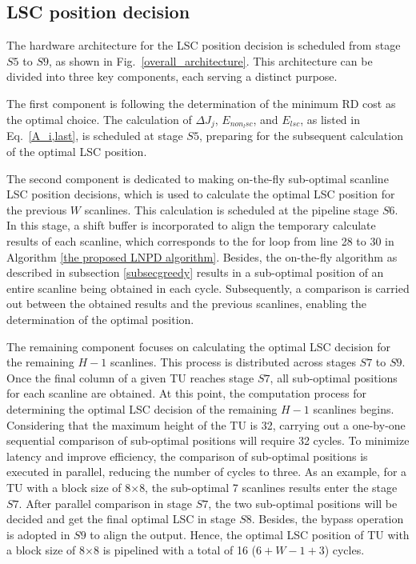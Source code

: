 \documentclass[lettersize,journal]{IEEEtran}
\begin{document}
\subsection{LSC position decision}

The hardware architecture for the LSC position decision is scheduled from stage $S5$ to $S9$, as shown in Fig.~\ref{overall_architecture}. This architecture can be divided into three key components, each serving a distinct purpose. 

The first component is following the determination of the minimum RD cost as the optimal choice. The calculation of $\Delta J_{j}$, $E_{non_lsc}$, and $E_{lsc}$, as listed in Eq.~\eqref{A_i,last}, is scheduled at stage $S5$, preparing for the subsequent calculation of the optimal LSC position. 

The second component is dedicated to making on-the-fly sub-optimal scanline LSC position decisions, which is used to calculate the optimal LSC position for the previous $W$ scanlines. This calculation is scheduled at the pipeline stage $S6$. In this stage, a shift buffer is incorporated to align the temporary calculate results of each scanline, which corresponds to the for loop from line 28 to 30 in Algorithm \ref{the proposed LNPD algorithm}. 
Besides, the on-the-fly algorithm as described in subsection \ref{subsecgreedy} results in a sub-optimal position of an entire scanline being obtained in each cycle. Subsequently, a comparison is carried out between the obtained results and the previous scanlines, enabling the determination of the optimal position. 

The remaining component focuses on calculating the optimal LSC decision for the remaining $H-1$ scanlines. This process is distributed across stages $S7$ to $S9$. 
Once the final column of a given TU reaches stage $S7$, all sub-optimal positions for each scanline are obtained. 
At this point, the computation process for determining the optimal LSC decision of the remaining $H-1$ scanlines begins. 
Considering that the maximum height of the TU is 32, carrying out a one-by-one sequential comparison of sub-optimal positions will require 32 cycles. 
To minimize latency and improve efficiency, the comparison of sub-optimal positions is executed in parallel, reducing the number of cycles to three. 
As an example, for a TU with a block size of 8$\times$8, the sub-optimal 7 scanlines results enter the stage $S7$. After parallel comparison in stage $S7$, the two sub-optimal positions will be decided and get the final optimal LSC in stage $S8$. Besides, the bypass operation is adopted in $S9$ to align the output. Hence, the optimal LSC position of TU with a block size of 8$\times$8 is pipelined with a total of 16 ($6 + W - 1 + 3$) cycles. 
\end{document}
